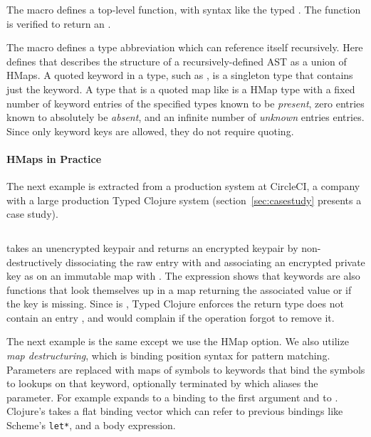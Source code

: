 \begin{exmp}
\inputminted[firstline=6,lastline=13]{clojure}{code/demo/src/demo/hmap.clj}
\label{example:decleaf}
\end{exmp}

The  macro defines a top-level function, with syntax like the typed .
The function  is verified to return an .

The  macro defines a type abbreviation which can reference itself recursively.
Here  defines 
that describes the structure of a recursively-defined AST as a union of HMaps.
A quoted keyword in a type, such as , is a singleton type that contains just the keyword.
A type that is a quoted map like  is a
HMap type with a fixed number of keyword entries of the specified types
known to be \emph{present},
zero entries known to absolutely be \emph{absent},
and an infinite number of \emph{unknown} entries entries.
Since only keyword keys are allowed, they do not require quoting.

\paragraph{HMaps in Practice} The next example is extracted from a production system at CircleCI,
a company with a large production Typed Clojure system
(section~\ref{sec:casestudy} presents a case study).

\begin{exmp}
\inputminted[firstline=10,lastline=22]{clojure}{code/demo/src/demo/key.clj}
\label{example:circleci}
\end{exmp}

 takes an unencrypted keypair and returns an encrypted keypair by
non-destructively dissociating the raw  entry with 
and associating an encrypted private key
as  on an immutable map with .
The expression  shows that keywords are also 
functions that look themselves up in a map returning the associated value or \nil{} if the key is missing.
Since  is , Typed Clojure enforces the return type
does not contain an entry , and would complain if the 
operation forgot to remove it.

The next example is the same except we use the  HMap option.
We also
utilize \emph{map destructuring}, which is binding position syntax for pattern matching.
Parameters are replaced with maps of symbols to keywords that bind the symbols
to lookups on that keyword, optionally terminated by 
which aliases the parameter. For example
expands to a  binding  to the first argument and 
 to .
Clojure's  takes a flat binding vector which can refer to previous bindings like Scheme's \texttt{let*},
and a body expression.

